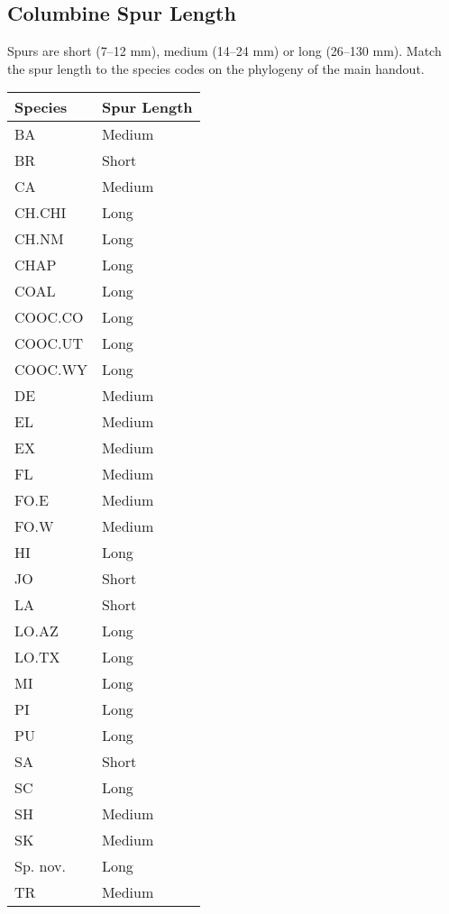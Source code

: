 \documentclass[11pt, addpoints]{exam}
\begin{document}
\subsection*{Columbine Spur Length}

Spurs are short (7--12 mm), medium (14--24 mm) or long (26--130 mm). Match
the spur length to the species codes on the phylogeny of the main
handout.

\vspace{\baselineskip}

\begin{tabular}[c]{@{}ll@{}}
\toprule
Species & Spur Length\tabularnewline
\midrule
BA & Medium\tabularnewline
BR & Short\tabularnewline
CA & Medium\tabularnewline
CH.CHI & Long\tabularnewline
CH.NM & Long\tabularnewline
CHAP & Long\tabularnewline
COAL & Long\tabularnewline
COOC.CO & Long\tabularnewline
COOC.UT & Long\tabularnewline
COOC.WY & Long\tabularnewline
DE & Medium\tabularnewline
EL & Medium\tabularnewline
EX & Medium\tabularnewline
FL & Medium\tabularnewline
FO.E & Medium\tabularnewline
FO.W & Medium\tabularnewline
HI & Long\tabularnewline
JO & Short\tabularnewline
LA & Short\tabularnewline
LO.AZ & Long\tabularnewline
LO.TX & Long\tabularnewline
MI & Long\tabularnewline
PI & Long\tabularnewline
PU & Long\tabularnewline
SA & Short\tabularnewline
SC & Long\tabularnewline
SH & Medium\tabularnewline
SK & Medium\tabularnewline
Sp. nov.\footnotemark & Long\tabularnewline
TR & Medium\tabularnewline
\bottomrule
\end{tabular}

\end{document}
